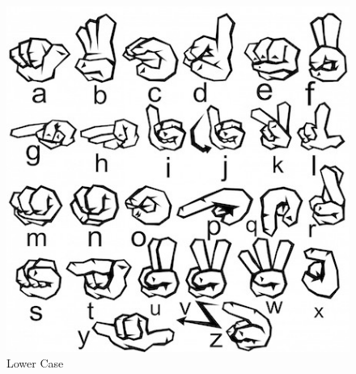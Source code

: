 \documentclass[12pt, titlepage]{article}
\begin{document}
\begin{figure}[H] 
\centering
\includegraphics[width=\textwidth,height=0.8\textheight,keepaspectratio]{lower_cases.PNG} 
\caption{Lower Case} 
\label{Fig.Lower Case} 
\end{figure}
\end{document}
